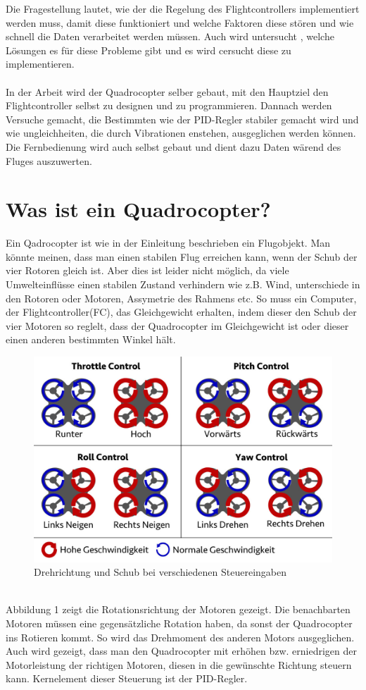 \documentclass[12pt,a4paper, ngerman]{article}
\begin{document}
\fi
Die Fragestellung lautet, wie der die Regelung des Flightcontrollers implementiert werden muss, damit diese funktioniert und welche Faktoren diese stören und wie schnell die Daten verarbeitet werden müssen. Auch wird untersucht , welche Lösungen es für diese Probleme gibt und es wird cersucht diese zu implementieren. \\ \\
In der Arbeit wird der Quadrocopter selber gebaut, mit den Hauptziel den Flightcontroller selbst zu designen und zu programmieren. Dannach werden Versuche gemacht, die Bestimmten wie der PID-Regler stabiler gemacht wird und wie ungleichheiten, die durch Vibrationen enstehen, ausgeglichen werden können. Die Fernbedienung wird auch selbst gebaut und dient dazu Daten wärend des Fluges auszuwerten. 
\newpage
\section{Was ist ein Quadrocopter?}
Ein Qadrocopter ist wie in der Einleitung beschrieben ein Flugobjekt. Man könnte meinen, dass man einen stabilen Flug erreichen kann, wenn der Schub der vier Rotoren gleich ist. Aber dies ist leider nicht möglich, da viele Umwelteinflüsse einen stabilen Zustand verhindern wie z.B. Wind, unterschiede in den Rotoren oder Motoren, Assymetrie des Rahmens etc. So muss ein Computer, der Flightcontroller(FC), das Gleichgewicht erhalten, indem dieser den Schub der vier Motoren so reglelt, dass der Quadrocopter im Gleichgewicht ist oder dieser einen anderen bestimmten Winkel hält.\\
\begin{figure}[h]
\centering
\includegraphics[width=\textwidth]{MotionDE.jpg}
\caption[https://fpvracing.ch/de/content/7-grundsatzliche-funktion-quadrocopter-multicopter]{Drehrichtung und Schub bei verschiedenen Steuereingaben }
\end{figure}\\
Abbildung 1 zeigt die Rotationsrichtung der Motoren gezeigt. Die benachbarten Motoren müssen eine gegensätzliche Rotation haben, da sonst der Quadrocopter ins Rotieren kommt. So wird das Drehmoment des anderen Motors ausgeglichen. Auch wird gezeigt, dass man den Quadrocopter mit erhöhen bzw. erniedrigen der Motorleistung der richtigen Motoren, diesen in die gewünschte Richtung steuern kann. Kernelement dieser Steuerung ist der PID-Regler.
\end{document}
